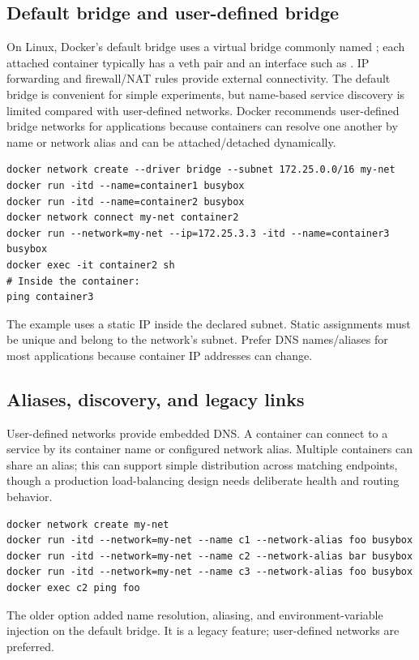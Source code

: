 \documentclass[11pt,a4paper]{article}
\newcommand{\cmd}[1]{\texttt{\detokenize{#1}}}
\begin{document}
\subsection{Default bridge and user-defined bridge}
On Linux, Docker's default bridge uses a virtual bridge commonly named \cmd{docker0}; each attached container typically has a veth pair and an interface such as \cmd{eth0}. IP forwarding and firewall/NAT rules provide external connectivity. The default bridge is convenient for simple experiments, but name-based service discovery is limited compared with user-defined networks. Docker recommends user-defined bridge networks for applications because containers can resolve one another by name or network alias and can be attached/detached dynamically.
\begin{lstlisting}
docker network create --driver bridge --subnet 172.25.0.0/16 my-net
docker run -itd --name=container1 busybox
docker run -itd --name=container2 busybox
docker network connect my-net container2
docker run --network=my-net --ip=172.25.3.3 -itd --name=container3 busybox
docker exec -it container2 sh
# Inside the container:
ping container3
\end{lstlisting}
The example uses a static IP inside the declared subnet. Static assignments must be unique and belong to the network's subnet. Prefer DNS names/aliases for most applications because container IP addresses can change.

\subsection{Aliases, discovery, and legacy links}
User-defined networks provide embedded DNS. A container can connect to a service by its container name or configured network alias. Multiple containers can share an alias; this can support simple distribution across matching endpoints, though a production load-balancing design needs deliberate health and routing behavior.
\begin{lstlisting}
docker network create my-net
docker run -itd --network=my-net --name c1 --network-alias foo busybox
docker run -itd --network=my-net --name c2 --network-alias bar busybox
docker run -itd --network=my-net --name c3 --network-alias foo busybox
docker exec c2 ping foo
\end{lstlisting}
The older \cmd{--link=CONTAINER:ALIAS} option added name resolution, aliasing, and environment-variable injection on the default bridge. It is a legacy feature; user-defined networks are preferred.
\end{document}
